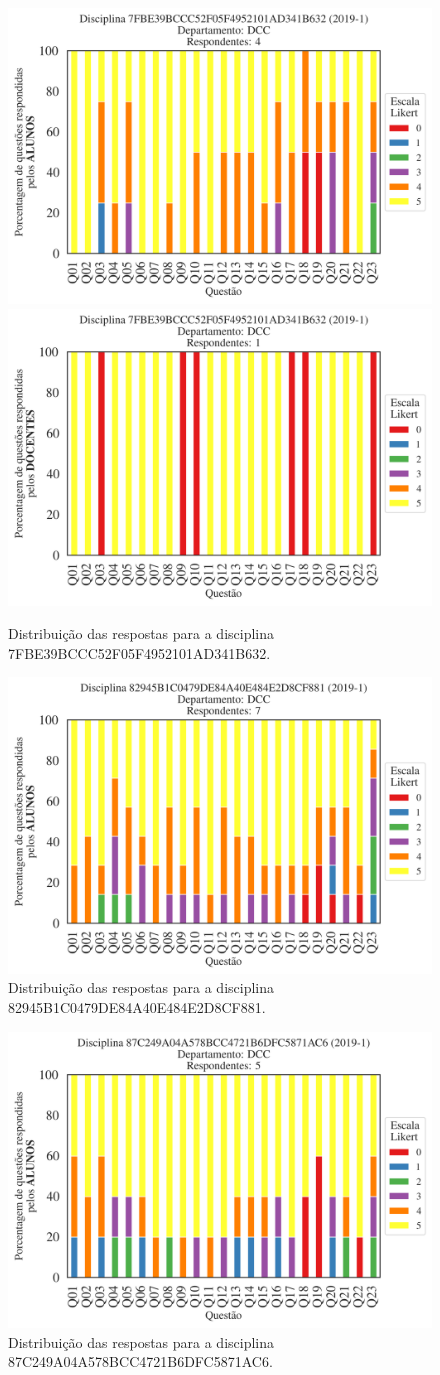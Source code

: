 \documentclass[a4paper,10pt]{article}
\begin{document}
\begin{figure}[h]
\centering
\includegraphics[width=0.485\linewidth]{analise_disciplina_departamento_DCC_ALUNO_TURMA_7FBE39BCCC52F05F4952101AD341B632.png}
\includegraphics[width=0.485\linewidth]{analise_disciplina_departamento_DCC_DOCENTE_TURMA_7FBE39BCCC52F05F4952101AD341B632.png}
\caption{\label{fig:analise_geral_departamento}                Distribuição das respostas para a disciplina 7FBE39BCCC52F05F4952101AD341B632.}
\end{figure}
\begin{figure}[h]
\centering
\includegraphics[width=0.485\linewidth]{analise_disciplina_departamento_DCC_ALUNO_TURMA_82945B1C0479DE84A40E484E2D8CF881.png}
\caption{\label{fig:analise_geral_departamento}                Distribuição das respostas para a disciplina 82945B1C0479DE84A40E484E2D8CF881.}
\end{figure}
\begin{figure}[h]
\centering
\includegraphics[width=0.485\linewidth]{analise_disciplina_departamento_DCC_ALUNO_TURMA_87C249A04A578BCC4721B6DFC5871AC6.png}
\caption{\label{fig:analise_geral_departamento}                Distribuição das respostas para a disciplina 87C249A04A578BCC4721B6DFC5871AC6.}
\end{figure}
\end{document}
